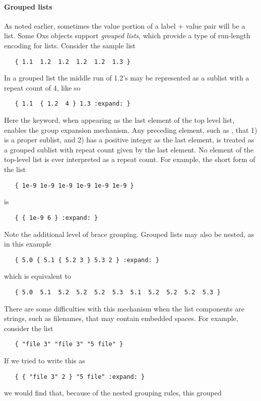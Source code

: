 \paragraph{Grouped lists}%
\label{par:groupedLists}
As noted earlier, sometimes the value portion of a label + value pair
will be a list.  Some Oxs objects support \textit{grouped lists}, which
provide a type of run-length encoding for lists.  Consider the sample
list
\begin{verbatim}
   { 1.1  1.2  1.2  1.2  1.2  1.3 }
\end{verbatim}
In a grouped list the middle run of 1.2's may be represented as a
sublist with a repeat count of 4, like so
\begin{verbatim}
   { 1.1  { 1.2  4 } 1.3 :expand: }
\end{verbatim}
Here the  keyword, when appearing as the last element of
the top level list, enables the group expansion mechanism.  Any
preceding element, such as , that 1) is a proper
sublist, and 2) has a positive integer as the last element, is treated
as a grouped sublist with repeat count given by the last element.  No
element of the top-level list is ever interpreted as a repeat count.
For example, the short form of the list
\begin{verbatim}
   { 1e-9 1e-9 1e-9 1e-9 1e-9 1e-9 }
\end{verbatim}
is
\begin{verbatim}
   { { 1e-9 6 } :expand: }
\end{verbatim}
Note the additional level of brace grouping.  Grouped lists may also be
nested, as in this example
\begin{verbatim}
   { 5.0 { 5.1 { 5.2 3 } 5.3 2 } :expand: }
\end{verbatim}
which is equivalent to
\begin{verbatim}
   { 5.0  5.1  5.2  5.2  5.2  5.3  5.1  5.2  5.2  5.2  5.3 }
\end{verbatim}
There are some difficulties with this mechanism when the list components
are strings, such as filenames, that may contain embedded spaces.  For
example, consider the list
\begin{verbatim}
   { "file 3" "file 3" "5 file" }
\end{verbatim}
If we tried to write this as
\begin{verbatim}
   { { "file 3" 2 } "5 file" :expand: }
\end{verbatim}
we would find that, because of the nested grouping rules, this grouped
